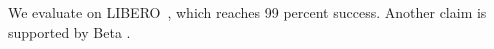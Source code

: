 \documentclass{article}
\begin{document}
\newcommand{\libero}{LIBERO~\cite{ka}}
We evaluate on \libero, which reaches 99 percent success.
Another claim is supported by Beta \cite{kb}.


\end{document}
